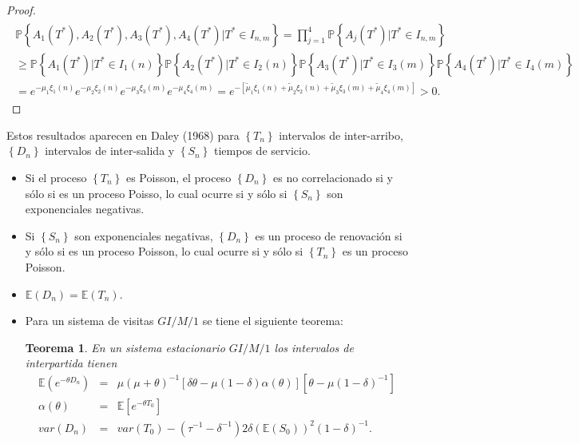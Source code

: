 \documentclass{article}
\newtheorem{Teo}{Teorema}[section]
\newcommand{\esp}{\mathbb{E}}
\newcommand{\prob}{\mathbb{P}}
\numberwithin{equation}{section}
\begin{document}
{\begin{proof}
\begin{eqnarray}
\begin{array}{l}
\prob\left\{A_{1}\left(T^{*}\right),A_{2}\left(T^{*}\right),
A_{3}\left(T^{*}\right),A_{4}\left(T^{*}\right)|T^{*}\in I_{n,m}\right\}
=\prod_{j=1}^{4}\prob\left\{A_{j}\left(T^{*}\right)|T^{*}\in I_{n,m}\right\}\\
\geq\prob\left\{A_{1}\left(T^{*}\right)|T^{*}\in I_{1}\left(n\right)\right\}
\prob\left\{A_{2}\left(T^{*}\right)|T^{*}\in I_{2}\left(n\right)\right\}
\prob\left\{A_{3}\left(T^{*}\right)|T^{*}\in I_{3}\left(m\right)\right\}
\prob\left\{A_{4}\left(T^{*}\right)|T^{*}\in I_{4}\left(m\right)\right\}\\
=e^{-\mu_{1}\xi_{1}\left(n\right)}
e^{-\mu_{2}\xi_{2}\left(n\right)}
e^{-\mu_{3}\xi_{3}\left(m\right)}
e^{-\mu_{4}\xi_{4}\left(m\right)}
=e^{-\left[\tilde{\mu}_{1}\xi_{1}\left(n\right)
+\tilde{\mu}_{2}\xi_{2}\left(n\right)
+\tilde{\mu}_{3}\xi_{3}\left(m\right)
+\tilde{\mu}_{4}\xi_{4}
\left(m\right)\right]}>0.
\end{array}
\end{eqnarray}
\end{proof}


Estos resultados aparecen en Daley (1968) \cite{Daley68} para $\left\{T_{n}\right\}$ intervalos de inter-arribo, $\left\{D_{n}\right\}$ intervalos de inter-salida y $\left\{S_{n}\right\}$ tiempos de servicio.

\begin{itemize}
\item Si el proceso $\left\{T_{n}\right\}$ es Poisson, el proceso $\left\{D_{n}\right\}$ es no correlacionado si y s\'olo si es un proceso Poisso, lo cual ocurre si y s\'olo si $\left\{S_{n}\right\}$ son exponenciales negativas.

\item Si $\left\{S_{n}\right\}$ son exponenciales negativas, $\left\{D_{n}\right\}$ es un proceso de renovaci\'on  si y s\'olo si es un proceso Poisson, lo cual ocurre si y s\'olo si $\left\{T_{n}\right\}$ es un proceso Poisson.

\item $\esp\left(D_{n}\right)=\esp\left(T_{n}\right)$.

\item Para un sistema de visitas $GI/M/1$ se tiene el siguiente teorema:

\begin{Teo}
En un sistema estacionario $GI/M/1$ los intervalos de interpartida tienen
\begin{eqnarray*}
\esp\left(e^{-\theta D_{n}}\right)&=&\mu\left(\mu+\theta\right)^{-1}\left[\delta\theta
-\mu\left(1-\delta\right)\alpha\left(\theta\right)\right]
\left[\theta-\mu\left(1-\delta\right)^{-1}\right]\\
\alpha\left(\theta\right)&=&\esp\left[e^{-\theta T_{0}}\right]\\
var\left(D_{n}\right)&=&var\left(T_{0}\right)-\left(\tau^{-1}-\delta^{-1}\right)
2\delta\left(\esp\left(S_{0}\right)\right)^{2}\left(1-\delta\right)^{-1}.
\end{eqnarray*}
\end{Teo}




\end{itemize}}
\end{document}
